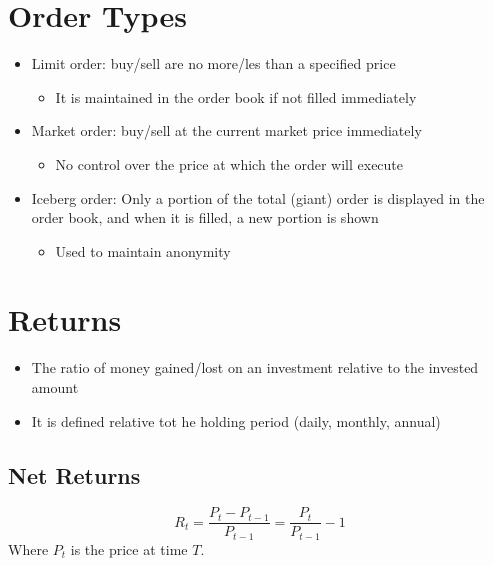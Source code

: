 \documentclass[
  oneside]{book}
\providecommand{\tightlist}{%
  \setlength{\itemsep}{0pt}\setlength{\parskip}{0pt}}
\begin{document}
\hypertarget{order-types}{%
\section{Order Types}\label{order-types}}

\begin{itemize}
\tightlist
\item
  Limit order: buy/sell are no more/les than a specified price

  \begin{itemize}
  \tightlist
  \item
    It is maintained in the order book if not filled immediately
  \end{itemize}
\item
  Market order: buy/sell at the current market price immediately

  \begin{itemize}
  \tightlist
  \item
    No control over the price at which the order will execute
  \end{itemize}
\item
  Iceberg order: Only a portion of the total (giant) order is displayed in the order book, and when it is filled, a new portion is shown

  \begin{itemize}
  \tightlist
  \item
    Used to maintain anonymity
  \end{itemize}
\end{itemize}

\hypertarget{returns}{%
\section{Returns}\label{returns}}

\begin{itemize}
\tightlist
\item
  The ratio of money gained/lost on an investment relative to the invested amount
\item
  It is defined relative tot he holding period (daily, monthly, annual)
\end{itemize}

\hypertarget{net-returns}{%
\subsection{Net Returns}\label{net-returns}}

\[
R_{t} = \frac{P_{t}-P_{t-1}}{P_{t-1}} = \frac{P_{t}}{P_{t-1}} - 1
\]
Where \(P_{t}\) is the price at time \(T\).
\end{document}
